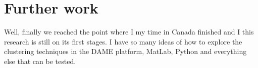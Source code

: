 \documentclass[11pt,fleqn]{book} %
\begin{document}
{																																																																																																																																																																																																																																																																																																	     %


																																																																																																																																																																																																																																																																																																	     \section{Further work}
																																																																																																																																																																																																																																																																																																	     Well, finally we reached the point where I my time in Canada finished and I this research is still on its first stages. I have so many ideas of how to explore the clustering techniques in the DAME platform, MatLab, Python and everything else that can be tested. 

}
\end{document}

